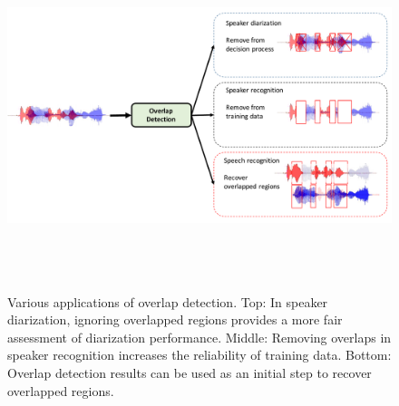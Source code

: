 \begin{figure}[h!]
	\centering
	\vspace{0mm}
	\includegraphics[height = 4in, width=1.\textwidth]{figures/overlap_detection_applications}
	\vspace{-3mm}
	\caption{ \small Various applications of overlap detection. Top: In speaker diarization, ignoring overlapped regions provides a more fair assessment of diarization performance. Middle: Removing overlaps in speaker recognition increases the reliability of training data. Bottom: Overlap detection results can be used as an initial step to recover overlapped regions.}
	\label{fig:ch1_overlap_applications}
	\vspace{-3mm}
\end{figure}

